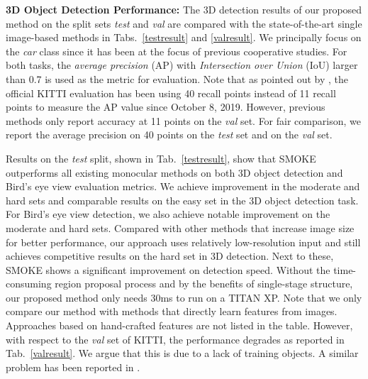 \documentclass[10pt,twocolumn,letterpaper]{article}
\renewcommand{\paragraph}[1]{

        \vspace{3pt}
	\noindent\textbf{#1}}
\begin{document}
    \paragraph{3D Object Detection Performance:} 
    The 3D detection results of our proposed method on the split sets \textit{test} and \textit{val} are compared with the state-of-the-art single image-based methods in Tabs.~\ref{testresult} and \ref{valresult}. We principally focus on the \emph{car} class since it has been at the focus of previous cooperative studies. For both tasks, the \emph{average precision} (AP) with \emph{Intersection over Union} (IoU) larger than 0.7 is used as the metric for evaluation. Note that as pointed out by \cite{monodis_2019}, the official KITTI evaluation has been using 40 recall points instead of 11 recall points to measure the AP value since October 8, 2019. However, previous methods only report accuracy at 11 points on the \textit{val} set. For fair comparison, we report the average precision on 40 points  on the \textit{test} set and  on the \textit{val} set.
    
    Results on the \textit{test} split, shown in Tab.~\ref{testresult}, show that SMOKE outperforms all existing monocular methods on both 3D object detection and Bird's eye view evaluation metrics. We achieve improvement in the moderate and hard sets and comparable results on the easy set in the 3D object detection task. For Bird's eye view detection, we also achieve notable improvement on the moderate and hard sets. Compared with other methods that increase image size for better performance, our approach uses relatively low-resolution input and still achieves competitive results on the hard set in 3D detection. Next to these, SMOKE shows a significant improvement on detection speed. Without the time-consuming region proposal process and by the benefits of single-stage structure, our proposed method only needs 30ms to run on a TITAN XP. Note that we only compare our method with methods that directly learn features from images. Approaches based on hand-crafted features \cite{monopl_2019, am3d_2019} are not listed in the table. However, with respect to the \textit{val} set of KITTI, the performance degrades as reported in Tab.~\ref{valresult}. We argue that this is due to a lack of training objects. A similar problem has been reported in \cite{centernet_2019}.
       
\end{document}
